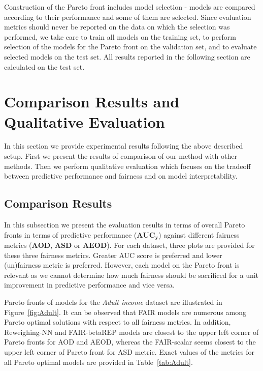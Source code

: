 \documentclass[preprint,12pt]{elsarticle}
\begin{document}
Construction of the Pareto front includes model selection - models are compared according to their performance and some of them are selected. Since evaluation metrics should never be reported on the data on which the selection was performed, we take care to train all models on the training set, to perform selection of the models for the Pareto front on the validation set, and to evaluate selected models on the test set. All results reported in the following section are calculated on the test set.

\section{Comparison Results and Qualitative Evaluation}
\label{sec:ResultsDiscussion}

In this section we provide experimental results following the above described setup. First we present the results of comparison of our method with other methods. Then we perform qualitative evaluation which focuses on the tradeoff between predictive performance and fairness and on model interpretability.


\subsection{Comparison Results}
\label{sec:Results}

In this subsection we present the evaluation results in terms of overall Pareto fronts in terms of predictive performance ($\mathbf{AUC_y}$) against different fairness metrics ($\mathbf{AOD}$, $\mathbf{ASD}$ or $\mathbf{AEOD}$). For each dataset, three plots are provided for these three fairness metrics. Greater AUC score is preferred and lower (un)fairness metric is preferred. However, each model on the Pareto front is relevant as we cannot determine how much fairness should be sacrificed for a unit improvement in predictive performance and vice versa.


Pareto fronts of models for the \textit{Adult income} dataset are illustrated in Figure~\ref{fig:Adult}.
It can be observed that FAIR models are numerous among Pareto optimal solutions with respect to all fairness metrics. In addition, Reweighing-NN and FAIR-betaREP models are closest to the upper left corner of Pareto fronts for AOD and AEOD, whereas the FAIR-scalar seems closest to the upper left corner of Pareto front for ASD metric. Exact values of the metrics for all Pareto optimal models are provided in Table~\ref{tab:Adult}.
\end{document}
